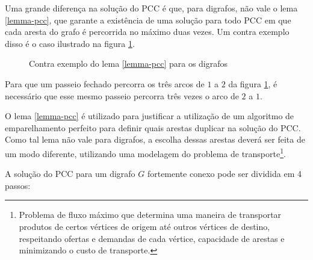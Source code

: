     Uma grande diferença na solução do PCC é que, para digrafos, não vale o lema \ref{lemma-pcc}, que garante a existência de uma solução para todo PCC em que cada aresta do grafo é percorrida no máximo duas vezes.
    Um contra exemplo disso é o caso ilustrado na figura \ref{counter-lemma}. 

    \begin{figure}[h]
        \centering
        \caption{Contra exemplo do lema \ref{lemma-pcc} para os digrafos}
        \label{counter-lemma}
    \end{figure}

    Para que um passeio fechado percorra os três arcos de $1$ a $2$ da figura \ref{counter-lemma}, é necessário que esse mesmo passeio percorra três vezes o arco de $2$ a $1$.

    O lema \ref{lemma-pcc} é utilizado para justificar a utilização de um algoritmo de emparelhamento perfeito para definir quais arestas duplicar na solução do PCC.
    Como tal lema não vale para digrafos, a escolha dessas arestas deverá ser feita de um modo diferente, utilizando uma modelagem do problema de transporte\footnote{Problema de fluxo máximo que determina uma maneira de transportar produtos de certos vértices de origem até outros vértices de destino, respeitando ofertas e demandas de cada vértice, capacidade de arestas e minimizando o custo de transporte.}.

    A solução do PCC para um digrafo $G$ fortemente conexo pode ser dividida em 4 passos:

